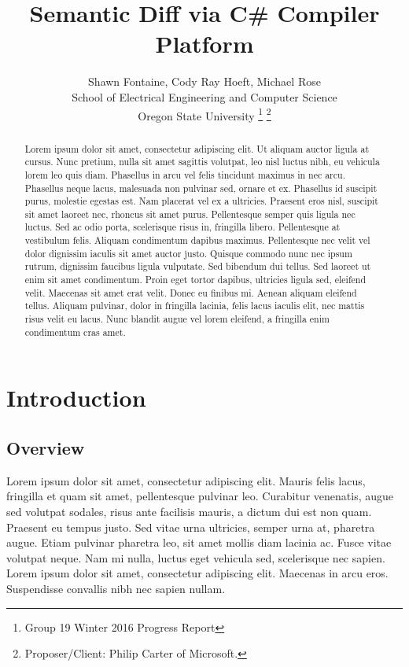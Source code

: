 \documentclass[draftclsnofoot,onecolumn]{IEEEtran}
\begin{document}
\lstset{style=cSharp}
\title{Semantic Diff via C\# Compiler Platform}

\author{Shawn Fontaine, Cody Ray Hoeft, Michael Rose\\
	School of Electrical Engineering and Computer Science\\
	Oregon State University
\thanks{Group 19 Winter 2016 Progress Report}
\thanks{Proposer/Client: Philip Carter of Microsoft.}}

\maketitle
{} %

\begin{abstract}
Lorem ipsum dolor sit amet, consectetur adipiscing elit. Ut aliquam auctor ligula at cursus. Nunc pretium, nulla sit amet sagittis volutpat, leo nisl luctus nibh, eu vehicula lorem leo quis diam. Phasellus in arcu vel felis tincidunt maximus in nec arcu. Phasellus neque lacus, malesuada non pulvinar sed, ornare et ex. Phasellus id suscipit purus, molestie egestas est. Nam placerat vel ex a ultricies. Praesent eros nisl, suscipit sit amet laoreet nec, rhoncus sit amet purus. Pellentesque semper quis ligula nec luctus. Sed ac odio porta, scelerisque risus in, fringilla libero. Pellentesque at vestibulum felis. Aliquam condimentum dapibus maximus. Pellentesque nec velit vel dolor dignissim iaculis sit amet auctor justo. Quisque commodo nunc nec ipsum rutrum, dignissim faucibus ligula vulputate. Sed bibendum dui tellus. Sed laoreet ut enim sit amet condimentum. Proin eget tortor dapibus, ultricies ligula sed, eleifend velit. Maecenas sit amet erat velit. Donec eu finibus mi. Aenean aliquam eleifend tellus. Aliquam pulvinar, dolor in fringilla lacinia, felis lacus iaculis elit, nec mattis risus velit eu lacus. Nunc blandit augue vel lorem eleifend, a fringilla enim condimentum cras amet.
\end{abstract}

\newpage
\setcounter{tocdepth}{2}
\tableofcontents
\newpage
{}
\section{Introduction}
\subsection{Overview}
Lorem ipsum dolor sit amet, consectetur adipiscing elit. Mauris felis lacus, fringilla et quam sit amet, pellentesque pulvinar leo. Curabitur venenatis, augue sed volutpat sodales, risus ante facilisis mauris, a dictum dui est non quam. Praesent eu tempus justo. Sed vitae urna ultricies, semper urna at, pharetra augue. Etiam pulvinar pharetra leo, sit amet mollis diam lacinia ac. Fusce vitae volutpat neque. Nam mi nulla, luctus eget vehicula sed, scelerisque nec sapien. Lorem ipsum dolor sit amet, consectetur adipiscing elit. Maecenas in arcu eros. Suspendisse convallis nibh nec sapien nullam.
\end{document}

